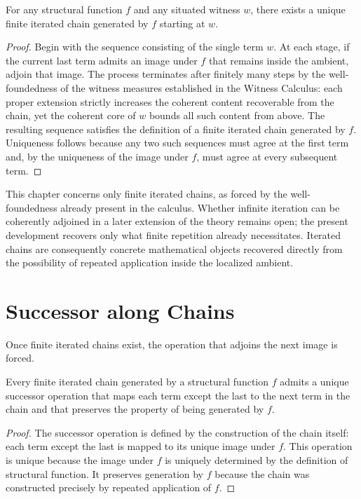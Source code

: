 \documentclass[12pt,anyside]{book}
\begin{document}
\begin{theorem}
For any structural function $f$ and any situated witness $w$, there exists a unique finite iterated chain generated by $f$ starting at $w$.
\end{theorem}

\begin{proof}
Begin with the sequence consisting of the single term $w$. At each stage, if the current last term admits an image under $f$ that remains inside the ambient, adjoin that image. The process terminates after finitely many steps by the well-foundedness of the witness measures established in the Witness Calculus: each proper extension strictly increases the coherent content recoverable from the chain, yet the coherent core of $w$ bounds all such content from above. The resulting sequence satisfies the definition of a finite iterated chain generated by $f$. Uniqueness follows because any two such sequences must agree at the first term and, by the uniqueness of the image under $f$, must agree at every subsequent term.
\end{proof}

This chapter concerns only finite iterated chains, as forced by the well-foundedness already present in the calculus. Whether infinite iteration can be coherently adjoined in a later extension of the theory remains open; the present development recovers only what finite repetition already necessitates. Iterated chains are consequently concrete mathematical objects recovered directly from the possibility of repeated application inside the localized ambient.

\section{Successor along Chains}
Once finite iterated chains exist, the operation that adjoins the next image is forced.

\begin{theorem}
Every finite iterated chain generated by a structural function $f$ admits a unique successor operation that maps each term except the last to the next term in the chain and that preserves the property of being generated by $f$.
\end{theorem}

\begin{proof}
The successor operation is defined by the construction of the chain itself: each term except the last is mapped to its unique image under $f$. This operation is unique because the image under $f$ is uniquely determined by the definition of structural function. It preserves generation by $f$ because the chain was constructed precisely by repeated application of $f$.
\end{proof}
\end{document}
